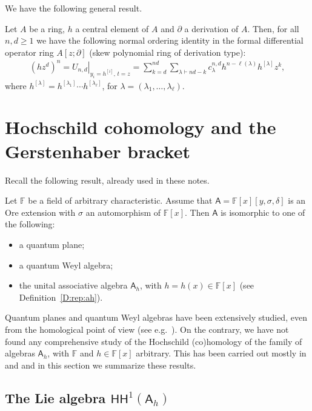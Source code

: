\documentclass{commat}
\newcommand{\FF}{\mathbb{F}}
\newcommand{\A}{\mathsf{A}}
\newcommand{\eval}[2]{\left. #1 \right|_{#2}}
\newcommand\hoch{\mathsf{HH}}
\begin{document}
We have the following general result.
\begin{theorem}\label{T:gen:d}
	Let $A$ be a ring, $h$ a central element of $A$ and $\partial$ a derivation of $A$. Then, for all $n, d\geq 1$ we have the following normal ordering identity in the formal differential operator ring $A[z; \partial]$ (skew polynomial ring of derivation type):
	\begin{align*}%
		(h z^d)^n= \eval{U_{n, d}}{y_i=h^{[i]},\, t=z}
		=\sum_{k=d}^{nd}\sum_{\lambda\vdash nd-k} c^{n, d}_\lambda h^{n-\ell(\lambda)}h^{[\lambda]}z^{k},
	\end{align*}
	where $h^{[\lambda]}=h^{[\lambda_1]}\cdots h^{[\lambda_\ell]}$, for $\lambda=(\lambda_1, \ldots, \lambda_\ell)$.
\end{theorem}

\section{Hochschild cohomology and the Gerstenhaber bracket}\label{S:hh}


Recall the following result, already used in these notes.

\begin{lemma}\label{lem:poly}  Let $\FF$ be a field of arbitrary characteristic. Assume that $\A = \FF[x][y,\sigma,\delta]$ is an Ore extension with $\sigma$ an automorphism of $\FF[x]$.   Then $\A$ is isomorphic
	to one of the following:
	\begin{itemize}
		\item[{\rm (a)}]   a  quantum plane;
		\item[{\rm (b)}]   a quantum Weyl algebra;
		\item[{\rm (c)}]   the unital associative algebra $\A_h$, with $h = h(x) \in \FF[x]$ (see Definition~\ref{D:rep:ah}).  
	\end{itemize}
\end{lemma}

Quantum planes and quantum Weyl algebras have been extensively studied, even from the homological point of view (see e.g.\ \cite{GG14}). On the contrary, we have not found any comprehensive study of the Hochschild (co)homology of the family of algebras $\A_h$, with $\FF$ and $h  \in \FF[x]$ arbitrary. This has been carried out mostly in \cite{BLO15ja} and \cite{LS21} and in this section we summarize these results.

\subsection{The Lie algebra \texorpdfstring{$\hoch^1(\A_h)$}{HH1(Ah)}}\label{SS:hh:hh1}
\end{document}
